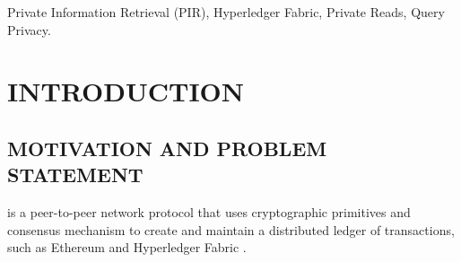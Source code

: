 \documentclass[letterpaper,journal]{IEEEtran}
\begin{document}
\begin{abstract}
  Permissioned blockchains ensure integrity and auditability of shared data but expose 
  query parameters to peers during read operations, creating privacy risks for organizations querying sensitive records. 
  This paper proposes a Private Information Retrieval (PIR) mechanism to enable \emph{private reads} from Hyperledger Fabric’s 
  world state, allowing endorsing peers to process encrypted queries without learning which record is accessed. We implement and benchmark a PIR-enabled 
  chaincode that performs ciphertext–plaintext (\emph{ct×pt}) homomorphic multiplication directly within \emph{evaluate} 
  transactions, preserving Fabric’s endorsement and audit semantics. The prototype achieves an average end-to-end latency 
  of 113~ms and a peer-side execution time below 42~ms, with approximately 2~MB of peer network traffic per private read in 
  development mode—reducible by half under in-process deployment. Storage profiling across three channel configurations shows 
  near-linear growth: block size increases from 77 kilobytes to 294 kilobytes and world-state from 112 kilobytes to 
  332 kilobytes as the ring dimension scales from 8,192 to 32,768 coefficients. Parameter analysis further indicates that 
  ring size and record length jointly constrain packing capacity, supporting up to 512~records of 64~bytes each 
  under the largest configuration. These results confirm the practicality of PIR-based \emph{private reads} in Fabric 
  for smaller, sensitive datasets and highlight future directions to optimize performance and scalability.
\end{abstract}
\begin{IEEEkeywords}
  Private Information Retrieval (PIR), Hyperledger Fabric, Private Reads, Query Privacy.
\end{IEEEkeywords}

\section{INTRODUCTION}\label{sec:introduction}

\subsection{MOTIVATION AND PROBLEM STATEMENT}
 \cite{nakamoto_bitcoin_2008} is a peer-to-peer network protocol that uses cryptographic primitives and 
consensus mechanism to create and maintain a distributed ledger of transactions, such as Ethereum \cite{wood_ethereum_2014} and 
Hyperledger Fabric \cite{androulaki_hyperledger_2018}.
\end{document}
